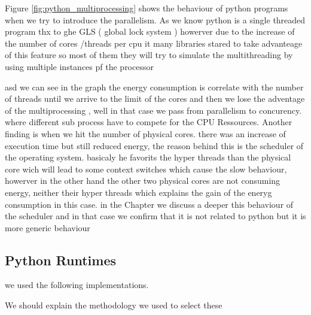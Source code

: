 Figure \ref{fig:python_multiprocessing} shows the behaviour of python programs when we try to introduce the parallelism.
As we know python is a single threaded program thx to ghe GLS ( global lock system ) howerver due to the increase of the number of cores /threads per cpu it many libraries stared to take advanteage of this feature so most of them they will try to simulate the multithreading by using multiple instances pf the processor %

asd we can see in the graph the energy consumption is correlate with the number of threads until we arrive to the limit of the cores and then we lose the adventage of the multiprocessing , well in that case we pass from parallelism to concurency. where different sub process have to compete for the CPU Ressources.
Another finding is when we hit the number of physical cores. there was an increase of execution time but still reduced energy, the reason behind this is the scheduler of the operating system. basicaly he favorits the hyper threads than the physical core wich will lead to some context switches which cause the slow behaviour, howerver in the other hand the other two physical cores are not consuming energy, neither their hyper threads which explains the gain of the eneryg consumption in this case.
in the Chapter %
we discuss a deeper this behaviour of the scheduler and in that case we confirm that it is not related to python but it is more generic behaviour %


\subsection{Python Runtimes}

we used the following implementations.

We should explain the methodology we used to select these

